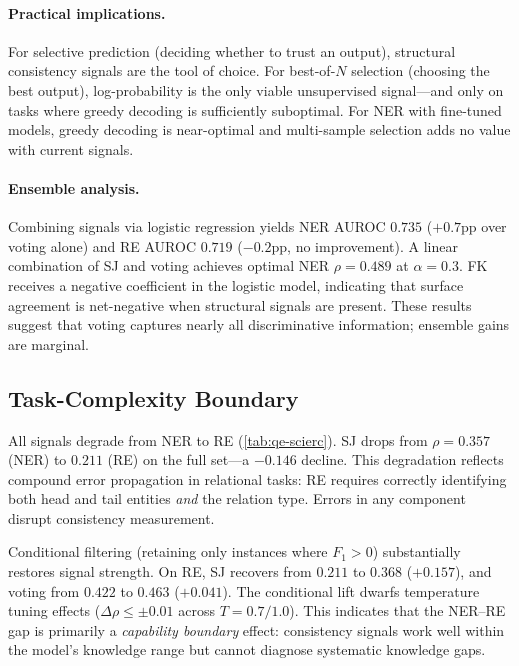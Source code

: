 \documentclass[11pt]{article}
\begin{document}
\paragraph{Practical implications.}
For selective prediction (deciding whether to trust an output), structural consistency signals are the tool of choice.
For best-of-$N$ selection (choosing the best output), log-probability is the only viable unsupervised signal---and only on tasks where greedy decoding is sufficiently suboptimal.
For NER with fine-tuned models, greedy decoding is near-optimal and multi-sample selection adds no value with current signals.

\paragraph{Ensemble analysis.}
Combining signals via logistic regression yields NER AUROC $0.735$ ($+0.7$pp over voting alone) and RE AUROC $0.719$ ($-0.2$pp, no improvement).
A linear combination of SJ and voting achieves optimal NER $\rho{=}0.489$ at $\alpha{=}0.3$.
FK receives a negative coefficient in the logistic model, indicating that surface agreement is net-negative when structural signals are present.
These results suggest that voting captures nearly all discriminative information; ensemble gains are marginal.

\subsection{Task-Complexity Boundary}
\label{sec:results-boundary}

All signals degrade from NER to RE (\cref{tab:qe-scierc}).
SJ drops from $\rho{=}0.357$ (NER) to $0.211$ (RE) on the full set---a $-0.146$ decline.
This degradation reflects compound error propagation in relational tasks: RE requires correctly identifying both head and tail entities \emph{and} the relation type.
Errors in any component disrupt consistency measurement.

Conditional filtering (retaining only instances where $F_1 > 0$) substantially restores signal strength.
On RE, SJ recovers from $0.211$ to $0.368$ ($+0.157$), and voting from $0.422$ to $0.463$ ($+0.041$).
The conditional lift dwarfs temperature tuning effects ($\Delta\rho \le \pm 0.01$ across $T{=}0.7/1.0$).
This indicates that the NER--RE gap is primarily a \emph{capability boundary} effect: consistency signals work well within the model's knowledge range but cannot diagnose systematic knowledge gaps.
\end{document}
